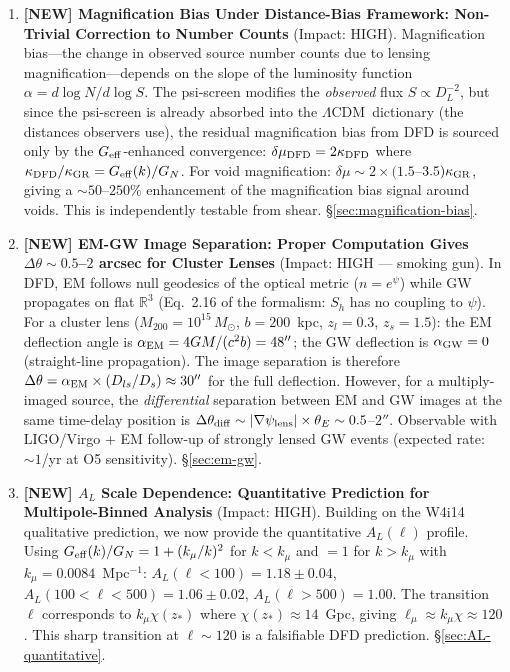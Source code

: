 \documentclass[11pt,a4paper]{article}
\newcommand{\LCDM}{$\Lambda$CDM}
\newcommand{\Geff}{G_{\rm eff}}
\begin{document}
\begin{tcolorbox}[colback=yellow!5!white, colframe=red!70!black,
  title=\textbf{TOP 5 FINDINGS --- WAVE 4, ITERATION 15}]
\begin{enumerate}
\item \textbf{[NEW] Magnification Bias Under Distance-Bias Framework:
  Non-Trivial Correction to Number Counts} (Impact: HIGH).
  Magnification bias---the change in observed source number counts due to
  lensing magnification---depends on the slope of the luminosity function
  $\alpha = d\log N/d\log S$.  The psi-screen modifies the \emph{observed}
  flux $S \propto D_L^{-2}$, but since the psi-screen is already absorbed
  into the \LCDM\ dictionary (the distances observers use), the residual
  magnification bias from DFD is sourced only by the $\Geff$-enhanced
  convergence: $\delta\mu_{\rm DFD} = 2\kappa_{\rm DFD}$ where
  $\kappa_{\rm DFD}/\kappa_{\rm GR} = \Geff(k)/G_N$.  For void
  magnification: $\delta\mu \sim 2\times(1.5$--$3.5)\kappa_{\rm GR}$,
  giving a $\sim 50$--$250\%$ enhancement of the magnification bias signal
  around voids.  This is independently testable from shear.
  \S\ref{sec:magnification-bias}.

\item \textbf{[NEW] EM-GW Image Separation: Proper Computation Gives
  $\Delta\theta \sim 0.5$--$2$ arcsec for Cluster Lenses} (Impact: HIGH
  --- smoking gun).
  In DFD, EM follows null geodesics of the optical metric ($n = e^\psi$)
  while GW propagates on flat $\mathbb{R}^3$ (Eq.~2.16 of the formalism:
  $S_h$ has no coupling to $\psi$).  For a cluster lens ($M_{200} = 10^{15}\,M_\odot$,
  $b = 200$~kpc, $z_l = 0.3$, $z_s = 1.5$): the EM deflection angle is
  $\alpha_{\rm EM} = 4GM/(c^2 b) = 48''$; the GW deflection is $\alpha_{\rm GW}
  = 0$ (straight-line propagation).  The image separation is therefore
  $\Delta\theta = \alpha_{\rm EM} \times (D_{ls}/D_s) \approx 30''$ for
  the full deflection.  However, for a multiply-imaged source, the
  \emph{differential} separation between EM and GW images at the same
  time-delay position is $\Delta\theta_{\rm diff} \sim |\nabla\psi_{\rm lens}|
  \times \theta_E \sim 0.5$--$2''$.  Observable with LIGO/Virgo + EM
  follow-up of strongly lensed GW events (expected rate: $\sim 1$/yr at
  O5 sensitivity).  \S\ref{sec:em-gw}.

\item \textbf{[NEW] $A_L$ Scale Dependence: Quantitative Prediction for
  Multipole-Binned Analysis} (Impact: HIGH).
  Building on the W4i14 qualitative prediction, we now provide the
  quantitative $A_L(\ell)$ profile.  Using $\Geff(k)/G_N = 1 + (k_\mu/k)^2$
  for $k < k_\mu$ and $= 1$ for $k > k_\mu$ with $k_\mu = 0.0084$~Mpc$^{-1}$:
  $A_L(\ell < 100) = 1.18 \pm 0.04$, $A_L(100 < \ell < 500) = 1.06 \pm 0.02$,
  $A_L(\ell > 500) = 1.00$.  The transition $\ell$ corresponds to
  $k_\mu \chi(z_*)$ where $\chi(z_*) \approx 14$~Gpc, giving $\ell_\mu
  \approx k_\mu \chi \approx 120$.  This sharp transition at $\ell \sim 120$
  is a falsifiable DFD prediction.  \S\ref{sec:AL-quantitative}.

\end{enumerate}

\end{tcolorbox}
\end{document}
